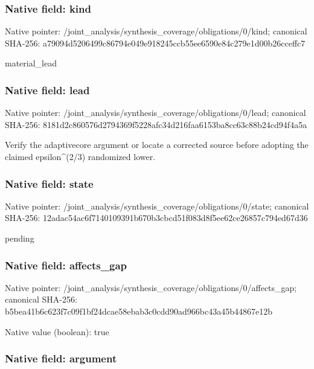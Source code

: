 \documentclass[10pt,a4paper]{article}
\begin{document}
\subsubsection{Native field: kind}


Native pointer: /joint\_analysis/synthesi\allowbreak{}s\_coverage/obligations/0\allowbreak{}/kind; canonical SHA-256: a79094d5206499c86794e049\allowbreak{}e918245ccb55ee6590e84c27\allowbreak{}9e1d00b26cceffc7


material\_lead


\subsubsection{Native field: lead}


Native pointer: /joint\_analysis/synthesi\allowbreak{}s\_coverage/obligations/0\allowbreak{}/lead; canonical SHA-256: 8181d2c860576d2794369f52\allowbreak{}28afc34d216faa6153ba8cc6\allowbreak{}3c88b24cd94f4a5a


Verify the adaptivecore argument or locate a corrected source before adopting the claimed epsilon\textasciicircum{}(2/3) randomized lower.


\subsubsection{Native field: state}


Native pointer: /joint\_analysis/synthesi\allowbreak{}s\_coverage/obligations/0\allowbreak{}/state; canonical SHA-256: 12adac54ac6f7140109391b6\allowbreak{}70b3cbcd51f083d8f5ee62ce\allowbreak{}26857c794ed67d36


pending


\subsubsection{Native field: affects\_gap}


Native pointer: /joint\_analysis/synthesi\allowbreak{}s\_coverage/obligations/0\allowbreak{}/affects\_gap; canonical SHA-256: b5bea41b6c623f7c09f1bf24\allowbreak{}dcae58ebab3c0cdd90ad966b\allowbreak{}c43a45b44867e12b



Native value (boolean): true



\subsubsection{Native field: argument}
\end{document}
